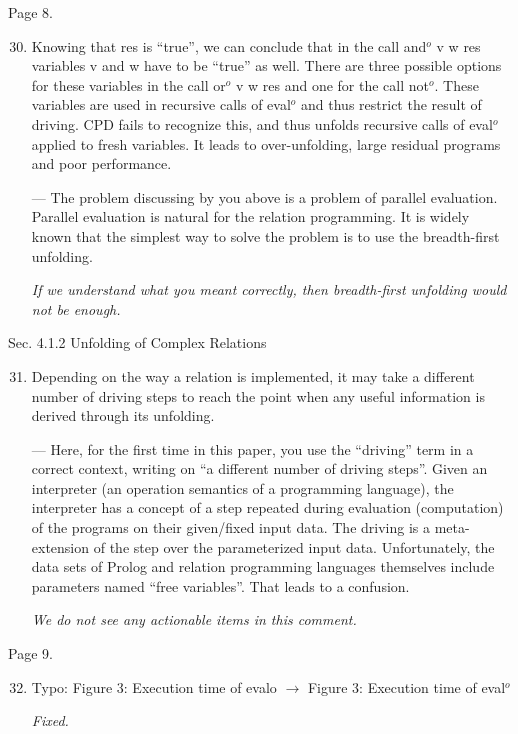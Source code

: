 Page 8.

\begin{enumerate}
  \setcounter{enumi}{29}
  \item {
  Knowing that res is ``true'', we can conclude that in the call and$^o$ v w res variables v and w have to be ``true'' as well. There are three possible options for these variables in the call or$^o$ v w res and one for the call not$^o$. These variables are used in recursive calls of eval$^o$ and thus restrict the result of driving. CPD fails to recognize this, and thus unfolds recursive calls of eval$^o$ applied to fresh variables. It leads to over-unfolding, large residual programs and poor performance.

  --- The problem discussing by you above is a problem of parallel evaluation. Parallel evaluation is natural for the relation programming. It is widely known that the simplest way to solve the problem is to use the breadth-first unfolding.

  \emph{If we understand what you meant correctly, then breadth-first unfolding would not be enough. }
  }

\end{enumerate}

Sec. 4.1.2 Unfolding of Complex Relations

\begin{enumerate}
  \setcounter{enumi}{30}
  \item Depending on the way a relation is implemented, it may take a different number of driving steps to reach the point when any useful information is derived through its unfolding.

  --- Here, for the first time in this paper, you use the ``driving'' term in a correct context, writing on ``a different number of driving steps''. Given an interpreter (an operation semantics of a programming language), the interpreter has a concept of a step repeated during evaluation (computation) of the programs on their given/fixed input data. The driving is a meta-extension of the step over the parameterized input data. Unfortunately, the data sets of Prolog and relation programming languages themselves include parameters named ``free variables''. That leads to a confusion.

  \emph{We do not see any actionable items in this comment.}

\end{enumerate}

Page 9.

\begin{enumerate}
  \setcounter{enumi}{31}
  \item {Typo:
  Figure 3: Execution time of evalo $\to$ Figure 3: Execution time of eval$^o$

  \emph{Fixed.}
  }
\end{enumerate}

